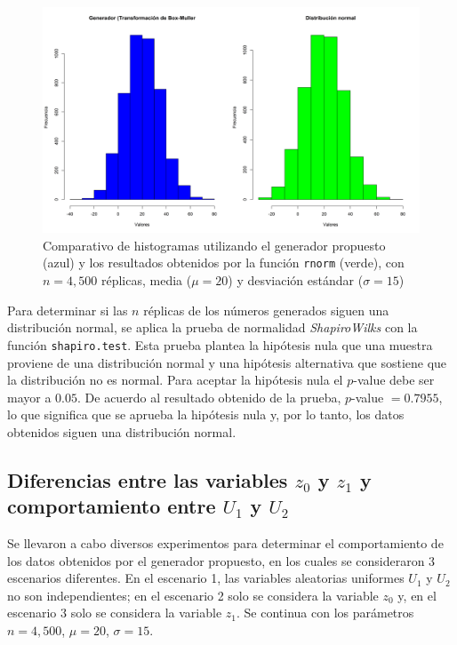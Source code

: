 \documentclass{article}
\begin{document}
\begin{figure}
\centering
\includegraphics[width=\linewidth]{Figures/comparativonormal.png}
\caption{Comparativo de histogramas utilizando el generador propuesto (azul) y los resultados obtenidos por la función \texttt{rnorm} (verde), con $n= 4,500$ réplicas, media ($\mu = 20$) y desviación estándar ($\sigma = 15$)}
\label{pseudonormal}
\end{figure}


Para determinar si las $n$ réplicas de los números generados siguen una distribución normal, se aplica la prueba de normalidad \textit{Shapiro\textendash Wilks} con la función \texttt{shapiro.test}. Esta prueba plantea la hipótesis nula que una muestra proviene de una distribución normal y una hipótesis alternativa que sostiene que la distribución no es normal. Para aceptar la hipótesis nula el $p$-value debe ser mayor a $0.05$. De acuerdo al resultado obtenido de la prueba,  $p$-value $= 0.7955$, lo que significa que se aprueba la hipótesis nula y, por lo tanto, los datos obtenidos siguen una distribución normal.


\subsection{Diferencias entre las variables $z_{0}$ y $z_{1}$ y comportamiento entre $U_{1}$ y $U_{2}$}

Se llevaron a cabo diversos experimentos para determinar el comportamiento de los datos obtenidos por el generador propuesto, en los cuales se consideraron $3$ escenarios diferentes. En el escenario 1, las variables aleatorias uniformes $U_{1}$ y $U_{2}$ no son independientes; en el escenario 2 solo se considera la variable $z_{0}$ y, en el escenario 3 solo se considera la variable $z_{1}$. Se continua con los parámetros $n=4,500$, $\mu = 20$, $\sigma = 15$.
\end{document}
